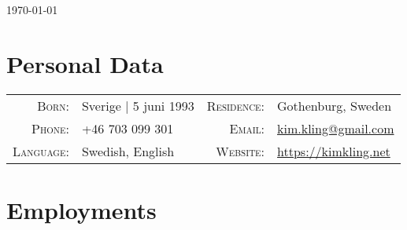 \documentclass[a4paper,10pt]{scrartcl} %
\begin{document}
\pagestyle{empty} %


\hfill {\small \today}
\par{
	\bigskip\par
	
}



\section{Personal Data}
\begin{tabular}{rp{6cm}rl}
	\textsc{Born:}      & Sverige | 5 juni 1993 &
	\textsc{Residence:} & Gothenburg, Sweden \\

	\textsc{Phone:}     & +46 703 099 301 & 
	\textsc{Email:}     & \href{mailto:kim.kling@gmail.com}{kim.kling@gmail.com} \\

	\textsc{Language:}  & Swedish, English & 
	\textsc{Website:}   & \href{https://kimkling.net}{https://kimkling.net}
\end{tabular}



\section{Employments}
\end{document}
